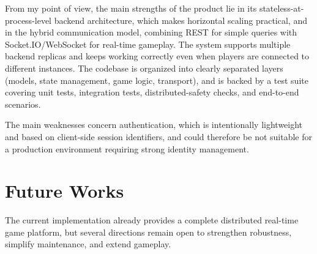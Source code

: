 \documentclass{scrartcl}
\begin{document}
From my point of view, the main strengths of the product lie in its stateless-at-process-level backend architecture, which makes horizontal scaling practical, and in the hybrid communication model, combining REST for simple queries with Socket.IO/WebSocket for real-time gameplay. The system supports multiple backend replicas and keeps working correctly even when players are connected to different instances. The codebase is organized into clearly separated layers (models, state management, game logic, transport), and is backed by a test suite covering unit tests, integration tests, distributed-safety checks, and end-to-end scenarios. 

The main weaknesses concern authentication, which is intentionally lightweight and based on client-side session identifiers, and could therefore be not suitable for a production environment requiring strong identity management.

\section{Future Works}\label{future-works}

The current implementation already provides a complete distributed real-time game
platform, but several directions remain open to strengthen robustness, simplify
maintenance, and extend gameplay.
\end{document}

